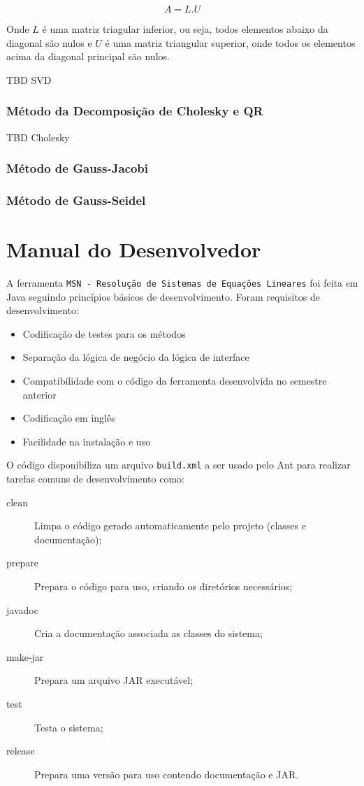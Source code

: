 \documentclass[a4paper,10pt]{report}
\newcommand{\ferramenta}{\texttt{MSN - Resolução de Sistemas de Equações Lineares}\xspace}
\begin{document}
\begin{equation*}
A = L.U
\end{equation*}

Onde $L$ é uma matriz triagular inferior, ou seja, todos elementos abaixo da diagonal são nulos e $U$ é uma matriz triangular superior, onde todos os elementos acima da diagonal principal são nulos.


TBD SVD

\subsection{Método da Decomposição de Cholesky e QR}


TBD Cholesky

\subsection{Método de Gauss-Jacobi}

\subsection{Método de Gauss-Seidel}

\chapter{Manual do Desenvolvedor}
\label{desenvolvedor}

A ferramenta \ferramenta foi feita em Java seguindo princípios básicos de desenvolvimento. Foram requisitos de desenvolvimento:

\begin{itemize}
 \item Codificação de testes para os métodos
 \item Separação da lógica de negócio da lógica de interface
 \item Compatibilidade com o código da ferramenta desenvolvida no semestre anterior\cite{msnlab}
 \item Codificação em inglês
 \item Facilidade na instalação e uso
\end{itemize}

O código disponibiliza um arquivo \texttt{build.xml} a ser usado pelo Ant\cite{ant} para realizar tarefas comuns de desenvolvimento como:

\begin{description}
 \item[clean] Limpa o código gerado automaticamente pelo projeto (classes e documentação);
 \item[prepare] Prepara o código para uso, criando os diretórios necessários;
 \item[javadoc] Cria a documentação associada as classes do sistema;
 \item[make-jar] Prepara um arquivo JAR executável;
 \item[test] Testa o sistema;
 \item[release] Prepara uma versão para uso contendo documentação e JAR.
 \end{description}
\end{document}
